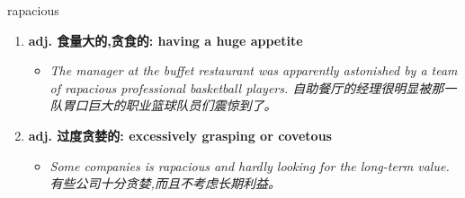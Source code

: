 
\begin{frame}
{\huge rapacious}
\begin{center}
\begin{enumerate}\Large
  \item \textbf{adj. 食量大的,贪食的: having a huge appetite}
  \begin{itemize}
    \item \em{\Large{The manager at the buffet restaurant was apparently astonished by a team of rapacious professional basketball players. 自助餐厅的经理很明显被那一队胃口巨大的职业篮球队员们震惊到了。}}
  \end{itemize}
  \item \textbf{adj. 过度贪婪的: excessively grasping or covetous}
  \begin{itemize}
    \item \em{\Large{Some companies is rapacious and hardly looking for the long-term value. 有些公司十分贪婪,而且不考虑长期利益。}}
  \end{itemize}
\end{enumerate}
\end{center}
\end{frame}
